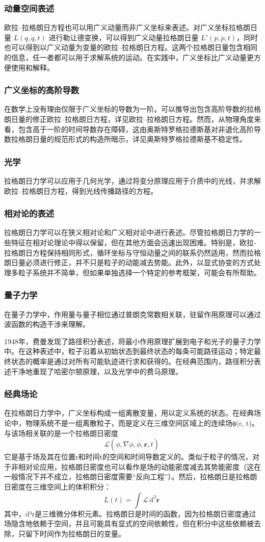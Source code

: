\subsubsection{动量空间表述}
欧拉–拉格朗日方程也可以用广义动量而非广义坐标来表述。对广义坐标拉格朗日量 \( L(q, \dot{q}, t) \) 进行勒让德变换，可以得到广义动量拉格朗日量 \( L'(p, \dot{p}, t) \)，同时也可以得到以广义动量为变量的欧拉–拉格朗日方程。这两个拉格朗日量包含相同的信息，任一者都可以用于求解系统的运动。在实践中，广义坐标比广义动量更方便使用和解释。
\subsubsection{广义坐标的高阶导数}
在数学上没有理由仅限于广义坐标的导数为一阶。可以推导出包含高阶导数的拉格朗日量的修正欧拉–拉格朗日方程，详见欧拉–拉格朗日方程。然而，从物理角度来看，包含高于一阶的时间导数存在障碍，这由奥斯特罗格拉德斯基对非退化高阶导数拉格朗日量的规范形式的构造所暗示，详见奥斯特罗格拉德斯基不稳定性。
\subsubsection{光学}
拉格朗日力学可以应用于几何光学，通过将变分原理应用于介质中的光线，并求解欧拉–拉格朗日方程，得到光线传播路径的方程。
\subsubsection{相对论的表述}
拉格朗日力学可以在狭义相对论和广义相对论中进行表述。尽管拉格朗日力学的一些特征在相对论理论中得以保留，但在其他方面会迅速出现困难。特别是，欧拉-拉格朗日方程保持相同形式，循环坐标与守恒动量之间的联系仍然适用，然而拉格朗日量必须进行修正，并不只是粒子的动能减去势能。此外，以显式协变的方式处理多粒子系统并不简单，但如果单独选择一个特定的参考框架，可能会有所帮助。
\subsubsection{量子力学}
在量子力学中，作用量与量子相位通过普朗克常数相关联，驻留作用原理可以通过波函数的构造干涉来理解。

1948年，费曼发现了路径积分表述，将最小作用原理扩展到电子和光子的量子力学中。在这种表述中，粒子沿着从初始状态到最终状态的每条可能路径运动；特定最终状态的概率是通过对所有可能轨迹进行求和获得的。在经典范围内，路径积分表述干净地重现了哈密尔顿原理，以及光学中的费马原理。
\subsubsection{经典场论}
在拉格朗日力学中，广义坐标构成一组离散变量，用以定义系统的状态。在经典场论中，物理系统不是一组离散粒子，而是定义在三维空间区域上的连续场ϕ(r, t)。与该场相关联的是一个拉格朗日密度
\[
\mathcal{L}(\phi, \nabla \phi, \dot{\phi}, \mathbf{r}, t)~
\]
它是基于场及其在位置r和时间t的空间和时间导数定义的。类似于粒子的情况，对于非相对论应用，拉格朗日密度也可以看作是场的动能密度减去其势能密度（这在一般情况下并不成立，拉格朗日密度需要“反向工程”）。然后，拉格朗日是拉格朗日密度在三维空间上的体积积分：
\[
L(t) = \int \mathcal{L} \, \mathrm{d}^{3}\mathbf{r}~
\]
其中，d³r是三维微分体积元素。拉格朗日是时间的函数，因为拉格朗日密度通过场隐含地依赖于空间，并且可能具有显式的空间依赖性，但在积分中这些依赖被去除，只留下时间作为拉格朗日的变量。
